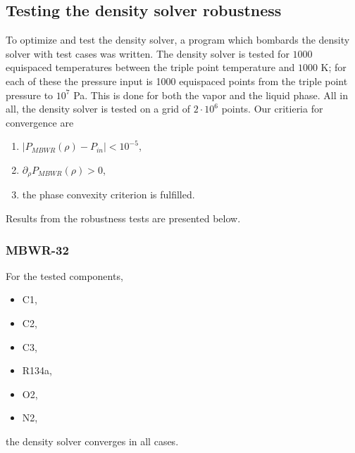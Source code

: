 \documentclass[english]{../thermomemo/thermomemo}
\numberwithin{equation}{section}
\begin{document}
\subsection{Testing the density solver robustness}
To optimize and test the density solver, a program which bombards the
density solver with test cases was written. The density solver is
tested for $1000$ equispaced temperatures between the triple point
temperature and $1000$ K; for each of these the pressure input is 1000
equispaced points from the triple point pressure to $10^7$ Pa. This is
done for both the vapor and the liquid phase. All in
all, the density solver is tested on a grid of $2 \cdot 10^6$
points. Our critieria for convergence are
\begin{enumerate}
\item $|P_{MBWR}(\rho)-P_{in}| < 10^{-5}$,
\item $\partial_\rho P_{MBWR}(\rho)> 0$,
\item the phase convexity criterion is fulfilled.
\end{enumerate}
Results from the robustness tests are presented below.

\subsubsection*{MBWR-32}
For the tested components,
\begin{itemize}
\item C1,
\item C2,
\item C3,
\item R134a,
\item O2,
\item N2,
\end{itemize}
the density solver converges in all cases.
\end{document}
